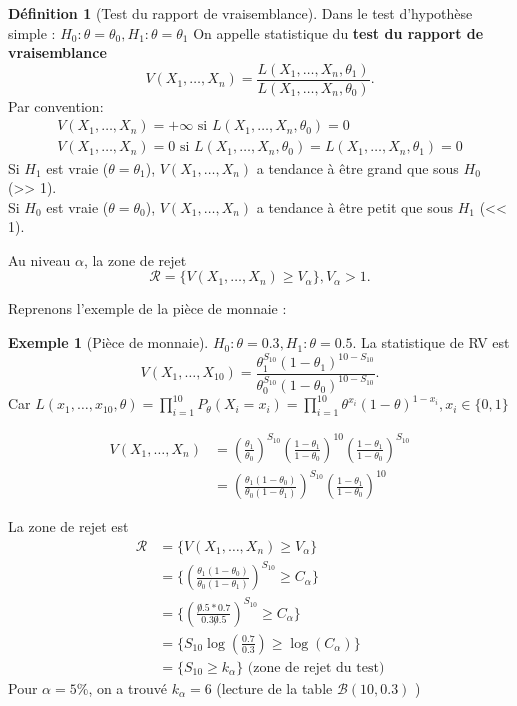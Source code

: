 \documentclass{article}
\theoremstyle{plain}%
\theoremstyle{definition}
\newtheorem{defn}{Définition}[section]
\newtheorem{exmp}{Exemple}[section]
\theoremstyle{remark}
\begin{document}
\begin{defn}[Test du rapport de vraisemblance]
    Dans le test d'hypothèse simple : $ H_0: \theta = \theta_0, H_1: \theta = \theta _1 $ On appelle statistique du \textbf{test du rapport de vraisemblance} 
    \[
        V(X_1,\dots, X_n) = \frac{L(X_1, \dots, X_n, \theta _1)}{L(X_1, \dots, X_n, \theta _0)}
    .\]
    Par convention:
    \begin{align*}
        V(X_1,\dots, X_n) = + \infty \text{ si } L(X_1,\dots, X_n, \theta _0) = 0 \\
        V(X_1,\dots, X_n) = 0 \text{ si } L(X_1,\dots, X_n, \theta _0) = L(X_1,\dots, X_n, \theta _1) = 0
    \end{align*}
    Si $ H_1 $ est vraie ($ \theta = \theta _1 $), $ V(X_1,\dots, X_n) $ a tendance à être grand que sous $ H_0 $ (>> 1). \\
    Si $ H_0 $ est vraie ($ \theta = \theta _0 $), $ V(X_1,\dots, X_n) $ a tendance à être petit que sous $ H_1 $ (<< 1). 

    Au niveau $ \alpha  $, la zone de rejet 
    \[
        \mathcal{R} = \{V(X_1,\dots, X_n) \geq V_\alpha \}, V_\alpha > 1
    .\]
\end{defn}

Reprenons l'exemple de la pièce de monnaie : 
\begin{exmp}[Pièce de monnaie]
    $ H_0: \theta = 0.3, H_1 : \theta = 0.5 $. La statistique de RV est 
    \[
        V(X_1,\dots, X_{10}) = \frac{\theta _1^{S_{10}} (1- \theta _1)^{10 - S_{10}}}{\theta _0^{S_{10}} (1 - \theta _0)^{10 - S_{10}}}
    .\]
    Car $ L(x_1, \dots, x_10, \theta ) = \prod_{i=1}^{10}P_\theta (X_i = x_i) = \prod_{i=1}^{10}\theta ^{x_i} (1- \theta )^{1 - x_i}, x_i \in \{0,1\} $ 

    \begin{align*}
        V(X_1,\dots, X_n) &= (\frac{\theta _1}{\theta _0})^{S_{10}} (\frac{1 - \theta _1}{1 - \theta _0})^{10} (\frac{1 - \theta _1}{1 - \theta _0})^{S_{10}} \\
        &= (\frac{\theta _1 (1-\theta _0)}{\theta _0 (1-\theta _1)})^{S_{10}} (\frac{1 - \theta _1}{1 - \theta _0})^{10}
    \end{align*}

    La zone de rejet est 
    \begin{align*}
        \mathcal{R} &= \{V(X_1,\dots, X_n) \geq V_\alpha \} \\
            &= \{(\frac{\theta _1 (1-\theta _0)}{\theta _0 (1-\theta _1)})^{S_{10}} \geq C_\alpha \} \\
            &= \{ ( \frac{\not 0.5 * 0.7}{0.3 \not 0.5})^{S_{10}} \geq C_\alpha \} \\
            &= \{S_{10} \log (\frac{0.7}{0.3}) \geq \log (C_\alpha )  \} \\
            &= \{S_{10} \geq k_\alpha \} \text{ (zone de rejet du test)}
    \end{align*}
    Pour $ \alpha = 5\% $, on a trouvé $ k_\alpha = 6 $ (lecture de la table $ \mathcal{B}(10,0.3) $ )
\end{exmp}
\end{document}
